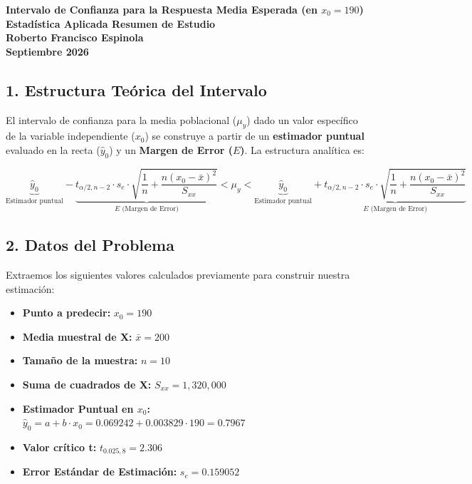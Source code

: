 \documentclass[11pt,a4paper]{article}
\begin{document}
\begin{center}
    \Large \textbf{Intervalo de Confianza para la Respuesta Media Esperada (en $x_0 = 190$)} \\[0.5cm]
    \normalsize \textbf{Estadística Aplicada Resumen de Estudio} \\
    \textbf{Roberto Francisco Espinola} \\
    \textbf{Septiembre 2026}
\end{center}

\vspace{0.5cm}

\subsection*{1. Estructura Teórica del Intervalo}
El intervalo de confianza para la media poblacional ($\mu_y$) dado un valor específico de la variable independiente ($x_0$) se construye a partir de un \textbf{estimador puntual} evaluado en la recta ($\hat{y}_0$) y un \textbf{Margen de Error ($E$)}. La estructura analítica es:

\[
\underbrace{\hat{y}_0}_{\text{Estimador puntual}} - \underbrace{t_{\alpha/2, n-2} \cdot s_e \cdot \sqrt{\frac{1}{n} + \frac{n(x_0 - \bar{x})^2}{S_{xx}}}}_{E \text{ (Margen de Error)}} < \mu_y < \underbrace{\hat{y}_0}_{\text{Estimador puntual}} + \underbrace{t_{\alpha/2, n-2} \cdot s_e \cdot \sqrt{\frac{1}{n} + \frac{n(x_0 - \bar{x})^2}{S_{xx}}}}_{E \text{ (Margen de Error)}}
\]

\subsection*{2. Datos del Problema}
Extraemos los siguientes valores calculados previamente para construir nuestra estimación:
\begin{itemize}
    \item \textbf{Punto a predecir:} $x_0 = 190$
    \item \textbf{Media muestral de X:} $\bar{x} = 200$
    \item \textbf{Tamaño de la muestra:} $n = 10$
    \item \textbf{Suma de cuadrados de X:} $S_{xx} = 1,320,000$
    \item \textbf{Estimador Puntual en $x_0$:} $\hat{y}_0 = a + b \cdot x_0 = 0.069242 + 0.003829 \cdot 190 = 0.7967$
    \item \textbf{Valor crítico t:} $t_{0.025, 8} = 2.306$
    \item \textbf{Error Estándar de Estimación:} $s_e = 0.159052$
\end{itemize}
\end{document}
